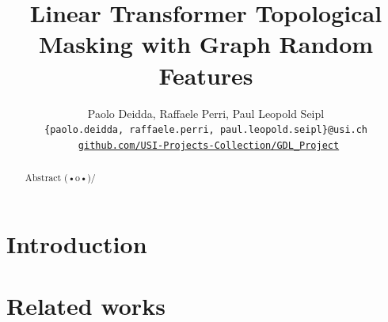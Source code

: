 \documentclass{gdl}
\begin{document}
\title{Linear Transformer Topological Masking with Graph Random Features}

\author{%
Paolo Deidda, Raffaele Perri, Paul Leopold Seipl\\
\texttt{\{paolo.deidda, raffaele.perri, paul.leopold.seipl\}@usi.ch}\\[0.5em]
\faGithub\ \href{https://github.com/USI-Projects-Collection/GDL_Project}{\texttt{github.com/USI-Projects-Collection/GDL\_Project}}
}

\begin{abstract}
    Abstract (•o•)/ 
\end{abstract}

\maketitle
\vfill
\tableofcontents

\newpage

\twocolumn

\section{Introduction}

\section{Related works}







\end{document}
